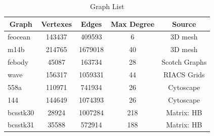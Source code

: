 \documentclass[12pt,glossary]{dalthesis}
\begin{document}
\begin{table}[h]
\centering
\caption{Graph List}
\label{graph-list}
\begin{tabular}{|l||c|c|c|c|}
\hline
\multicolumn{1}{|c||}{Graph} & Vertexes & Edges   & Max Degree & Source        \\ \hline
feocean                   & 143437   & 409593  & 6          & 3D mesh       \\
m14b                      & 214765   & 1679018 & 40         & 3D mesh       \\
febody                    & 45087    & 163734  & 28         & Scotch Graphs \\ 
wave                      & 156317   & 1059331 & 44         & RIACS Grids   \\
558a                      & 110971   & 741934  & 26         & Cytoscape     \\
144                       & 144649   & 1074393 & 26         & Cytoscape     \\
bcsstk30                  & 28924    & 1007284 & 218        & Matrix: HB    \\
bcsstk31                  & 35588    & 572914  & 188        & Matrix: HB    \\ \hline
\end{tabular}
\end{table}
\end{document}
